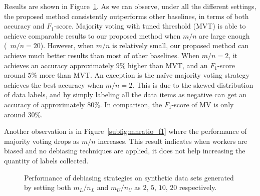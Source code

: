 Results are shown in Figure~\ref{fig:mnratio}.  
As we can observe, under all the different settings, 
the proposed method consistently outperforms other baselines, 
in terms of both accuracy and $F_1$-score. 
Majority voting with tuned threshold (MVT) 
is able to achieve comparable results to our proposed method 
when $m/n$ are large enough (\eg~$m/n=20$).
However, when $m/n$ is relatively small, 
our proposed method can achieve much better results than most of other baselines.  
When $m/n=2$, it achieves an accuracy approximately $9\%$ higher than MVT, 
and an $F_1$-score around $5\%$ more than MVT.  
An exception is the na\"{i}ve majority voting strategy achieves the best accuracy when $m/n=2$.  
This is due to the skewed distribution of data labels, 
and by simply labeling all the data items as negative can get an accuracy of approximately $80\%$.  
In comparison, the $F_1$-score of MV is only around $30\%$.  

Another observation is in Figure~\ref{subfig:mnratio_f1}
where the performance of majority voting drops as $m/n$ increases. 
This result indicates when workers are biased and no debiasing techniques are applied, 
it does not help increasing the quantity of labels collected. 

\begin{figure}[!t]
  \centering
  \caption{\label{fig:mnratio}
  Performance of debiasing strategies on synthetic data sets 
  generated by setting both $m_L/n_L$ and $m_U/n_U$ as $2$, $5$, $10$, $20$ respectively.
  }
\end{figure}


